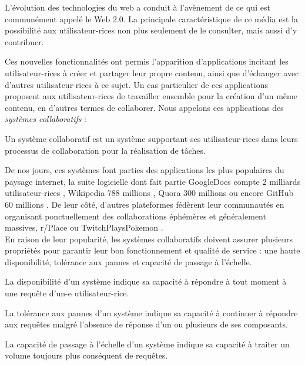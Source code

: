 \label{sec:intro-contexte}

L'évolution des technologies du web a conduit à l'avènement de ce qui est communément appelé le Web 2.0.
La principale caractéristique de ce média est la possibilité aux utilisateur-rices non plus seulement de le consulter, mais aussi d'y contribuer.

Ces nouvelles fonctionnalités ont permis l'apparition d'applications incitant les utilisateur-rices à créer et partager leur propre contenu, ainsi que d'échanger avec d'autres utilisateur-rices à ce sujet.
Un cas particulier de ces applications proposent aux utilisateur-rices de travailler ensemble pour la création d'un même contenu, en d'autres termes de collaborer.
Nous appelons ces applications des \emph{systèmes collaboratifs} :
\begin{definition}
  \label{def:collaborative-system}
  Un système collaboratif est un système supportant ses utilisateur-rices dans leurs processus de collaboration pour la réalisation de tâches.
\end{definition}

De nos jours, ces systèmes font parties des applications les plus populaires du paysage internet, \eg la suite logicielle dont fait partie GoogleDocs compte 2 milliards utilisateur-rices \cite{2020-google-g-suite-users}, Wikipedia 788 millions \cite{2022-09-monthly-active-users-wikipedia}, Quora 300 millions \cite{2022-01-monthly-active-users-social-networks} ou encore GitHub 60 millions \cite{2022-github-users}.
De leur côté, d'autres plateformes fédèrent leur communautés en organisant ponctuellement des collaborations éphémères et généralement massives, \eg r/Place \cite{2022-rplace} ou TwitchPlaysPokemon \cite{2014-twitch-plays-pokemon}.\\

En raison de leur popularité, les systèmes collaboratifs doivent assurer plusieurs propriétés pour garantir leur bon fonctionnement et qualité de service : une haute disponibilité, tolérance aux pannes et capacité de passage à l'échelle.
\begin{definition}[Disponibilité]
  \label{def:availability}
  La disponibilité d'un système indique sa capacité à répondre à tout moment à une requête d'un-e utilisateur-rice.
\end{definition}
\begin{definition}
  La tolérance aux pannes d'un système indique sa capacité à continuer à répondre aux requêtes malgré l'absence de réponse d'un ou plusieurs de ses composants.
\end{definition}
\begin{definition}
  La capacité de passage à l'échelle d'un système indique sa capacité à traiter un volume toujours plus conséquent de requêtes.
\end{definition}


